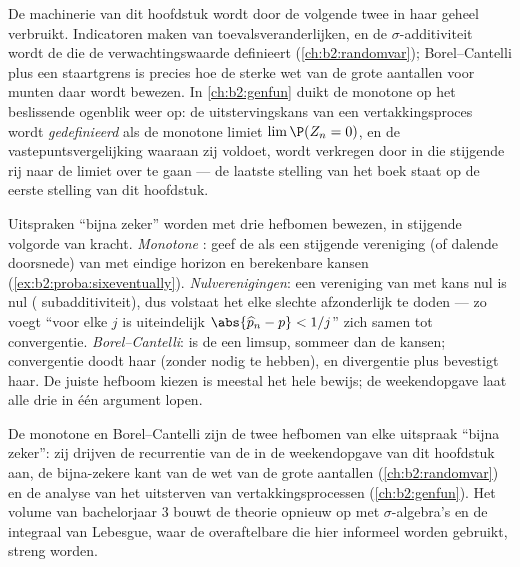 \begin{remark}
De machinerie van dit hoofdstuk wordt door de volgende twee in haar
geheel verbruikt. Indicatoren maken van 
toevalsveranderlijken, en de $\sigma$-additiviteit wordt de
 die de verwachtingswaarde definieert
(\cref{ch:b2:randomvar}); Borel--Cantelli plus een 
staartgrens is precies hoe de sterke wet van de grote aantallen
voor munten daar wordt bewezen. In \cref{ch:b2:genfun} duikt de
monotone  op het beslissende ogenblik weer op: de
uitstervingskans van een vertakkingsproces wordt \emph{gedefinieerd}
als de monotone limiet $\lim\P(Z_n = 0)$, en de
vastepuntsvergelijking waaraan zij voldoet, wordt verkregen door in
die stijgende rij naar de limiet over te gaan --- de laatste
stelling van het boek staat op de eerste stelling van dit
hoofdstuk.
\end{remark}

\begin{remark}
Uitspraken ``bijna zeker'' worden met drie hefbomen bewezen, in
stijgende volgorde van kracht. \emph{Monotone }: geef
de  als een stijgende vereniging (of dalende doorsnede)
van  met eindige horizon en berekenbare kansen
(\cref{ex:b2:proba:sixeventually}). \emph{Nulverenigingen}: een
 vereniging van  met kans nul is nul
( subadditiviteit), dus volstaat het elke slechte
 afzonderlijk te doden --- zo voegt ``voor elke $j$ is
uiteindelijk $\abs{\widehat p_n - p} < 1/j$'' zich samen tot
convergentie. \emph{Borel--Cantelli}: is de  een limsup,
sommeer dan de kansen; convergentie doodt haar (zonder
 nodig te hebben), en divergentie plus
 bevestigt haar. De juiste hefboom kiezen is
meestal het hele bewijs; de weekendopgave laat alle drie in één
argument lopen.
\end{remark}

\begin{remark}
De monotone  en Borel--Cantelli zijn de twee hefbomen
van elke uitspraak ``bijna zeker'': zij drijven de recurrentie van
de  in de weekendopgave van dit hoofdstuk aan, de
bijna-zekere kant van de wet van de grote aantallen
(\cref{ch:b2:randomvar}) en de analyse van het uitsterven van
vertakkingsprocessen (\cref{ch:b2:genfun}). Het volume van
bachelorjaar 3 bouwt de theorie opnieuw op met $\sigma$-algebra's
en de integraal van Lebesgue, waar de overaftelbare
 die hier informeel worden gebruikt, 
streng worden.
\end{remark}


